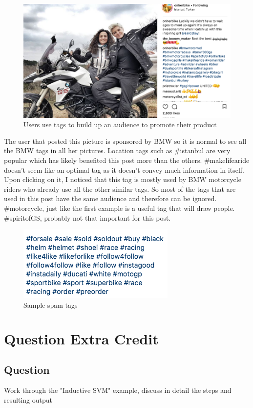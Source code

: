 \documentclass[10pt,letterpaper,bibliography=totoc]{scrartcl}
\begin{document}
\begin{figure}[h!]
\centering
\label{fig:insta-tag2}
\includegraphics[scale=.5]{insta-tag2.png}
\caption{Users use tags to build up an audience to promote their product}
\end{figure}

The user that posted this picture is sponsored by BMW so it is normal to see all the BMW tags in all her pictures. Location tags such as \#istanbul are very popular which has likely benefited this post more than the others. \#makelifearide doesn't seem like an optimal tag as it doesn't convey much information in itself. Upon clicking on it, I noticed that this tag is mostly used by BMW motorcycle riders who already use all the other similar tags. So most of the tags that are used in this post have the same audience and therefore can be ignored. \#motorcycle, just like the first example is a useful tag that will draw people. \#spiritofGS, probably not that important for this post.

\begin{figure}[h!]
\centering
\label{fig:insta-spam}
\includegraphics[scale=.5]{insta-spam.png}
\caption{Sample spam tags}
\end{figure}

\section{Question Extra Credit}
\subsection{Question}
Work through the "Inductive SVM" example, discuss in detail the steps and resulting output
\end{document}
